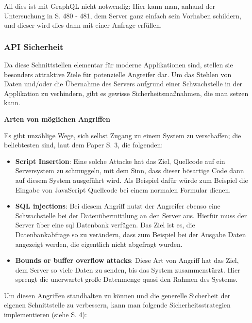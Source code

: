 All dies ist mit GraphQL nicht notwendig: Hier kann man, anhand der Untersuchung in \cite{book-modern-api-development-packt} S. 480 - 481, dem Server ganz einfach sein Vorhaben schildern, und dieser wird dies dann mit einer Anfrage erfüllen.

\subsubsection{API Sicherheit}

Da diese Schnittstellen elementar für moderne Applikationen sind, stellen sie besonders attraktive Ziele für potenzielle Angreifer dar. Um das Stehlen von Daten und/oder die Übernahme des Servers aufgrund einer Schwachstelle in der Applikation zu verhindern, gibt es gewisse Sicherheitsmaßnahmen, die man setzen kann.

\textbf{Arten von möglichen Angriffen}

Es gibt unzählige Wege, sich selbst Zugang zu einem System zu verschaffen; die beliebtesten sind, laut dem Paper \cite{paper-enterprise-api-security-and-gdpr-compliance} S. 3, die folgenden:

\begin{itemize}
    \item \textbf{Script Insertion}: Eine solche Attacke hat das Ziel, Quellcode auf ein Serversystem zu schmuggeln, mit dem Sinn, dass dieser bösartige Code dann auf diesem System ausgeführt wird. Als Beispiel dafür würde zum Beispiel die Eingabe von JavaScript Quellcode bei einem normalen Formular dienen.
    \item \textbf{SQL injections}: Bei diesem Angriff nutzt der Angreifer ebenso eine Schwachstelle bei der Datenübermittlung an den Server aus. Hierfür muss der Server über eine \gls{sql} Datenbank verfügen. Das Ziel ist es, die Datenbankabfrage so zu verändern, dass zum Beispiel bei der Ausgabe Daten angezeigt werden, die eigentlich nicht abgefragt wurden.
    \item \textbf{Bounds or buffer overflow attacks}: Diese Art von Angriff hat das Ziel, dem Server so viele Daten zu senden, bis das System zusammenstürzt. Hier sprengt die unerwartet große Datenmenge quasi den Rahmen des Systems. 
\end{itemize}

Um diesen Angriffen standhalten zu können und die generelle Sicherheit der eigenen Schnittstelle zu verbessern, kann man folgende Sicherheitsstrategien implementieren (siehe \cite{paper-enterprise-api-security-and-gdpr-compliance} S. 4):

